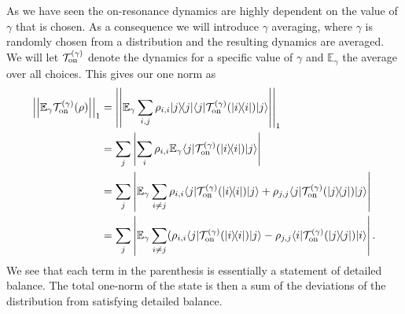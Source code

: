 \documentclass[
 amsmath,amssymb,
 aps,
onecolumn, 
nofootinbib]{revtex4-2}
\newcommand{\on}{\rm on}
\newcommand{\ket}[1]{|#1\rangle}
\newcommand{\bra}[1]{\langle #1|}
\newcommand{\ketbra}[2]{| #1\rangle\! \langle #2|}
\newcommand{\abs}[1]{\left| #1 \right|}
\newcommand{\norm}[1]{\left|\left| #1 \right|\right|}
\newcommand{\EE}{\mathbb{E}}
\begin{document}
As we have seen the on-resonance dynamics are highly dependent on the value of $\gamma$ that is chosen. As a consequence we will introduce $\gamma$ averaging, where $\gamma$ is randomly chosen from a distribution and the resulting dynamics are averaged. We will let $\mathcal{T}_{\on}^{(\gamma)}$ denote the dynamics for a specific value of $\gamma$ and $\EE_\gamma$ the average over all choices. This gives our one norm as
\begin{align}
    \norm{\EE_\gamma \mathcal{T}_{\on}^{(\gamma)}(\rho)}_1 &= \norm{\EE_\gamma \sum_{i, j} \rho_{i,i} \ketbra{j}{j} \bra{j} \mathcal{T}_{\on}^{(\gamma)}(\ketbra{i}{i})\ket{j} }_1 \nonumber \\
    &=\sum_{j} \abs{\sum_{i} \rho_{i,i} \EE_\gamma \bra{j}\mathcal{T}_{\on}^{(\gamma)}(\ketbra{i}{i}) \ket{j}} \\
    &= \sum_j \abs{\EE_{\gamma} \sum_{i \neq j} \rho_{i, i} \bra{j}\mathcal{T}_{\on}^{(\gamma)}(\ketbra{i}{i}) \ket{j} + \rho_{j, j} \bra{j}\mathcal{T}_{\on}^{(\gamma)}(\ketbra{j}{j}) \ket{j} }\\
    &=  \sum_{j} \abs{\EE_{\gamma} \sum_{i \neq j} (\rho_{i,i} \bra{j}\mathcal{T}_{\on}^{(\gamma)}(\ketbra{i}{i}) \ket{j} - \rho_{j, j} \bra{i}\mathcal{T}_{\on}^{(\gamma)}(\ketbra{j}{j}) \ket{i}}.
\end{align}
We see that each term in the parenthesis is essentially a statement of detailed balance. The total one-norm of the state is then a sum of the deviations of the distribution from satisfying detailed balance. 
\end{document}
